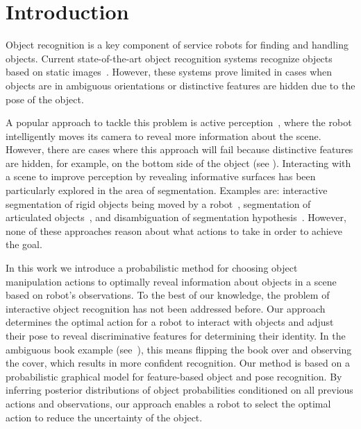 
\section{Introduction}
    \vspace{-0.5ex}


Object recognition is a key component of service robots for finding and handling objects.
Current state-of-the-art object recognition systems recognize objects based on static images~\cite{tang2012textured,van2013fusing}.
However, these systems prove limited in cases when objects are in ambiguous orientations or distinctive features are hidden due to the pose of the object.

A popular approach to tackle this problem is active perception~\cite{atanasov2013hypothesis}, where the robot intelligently moves its camera to reveal more information about the scene.
However, there are cases where this approach will fail because distinctive features are hidden, for example, on the bottom side of the object (see ).
Interacting with a scene to improve perception by revealing informative surfaces has been particularly explored in the area of segmentation.
Examples are: interactive segmentation of rigid objects being moved by a robot~\cite{KenneyInteractive}, segmentation of articulated objects~\cite{Katz-WS-MM-ICRA2011}, and disambiguation of segmentation hypothesis~\cite{bergstrom11icvs}.
However, none of these approaches reason about what actions to take in order to achieve the goal.

In this work we introduce a probabilistic method for choosing object manipulation actions to optimally reveal information about objects in a scene based on robot's observations.
To the best of our knowledge, the problem of interactive object recognition has not been addressed before. 
Our approach determines the optimal action for a robot to interact with objects and adjust their pose to reveal discriminative features for determining their identity.
In the ambiguous book example (see~), this means flipping the book over and observing the cover, which results in more confident recognition.
Our method is based on a probabilistic graphical model for feature-based object and pose recognition.
By inferring posterior distributions of object probabilities conditioned on all previous actions and observations, our approach enables a robot to select the optimal action to reduce the uncertainty of the object.

